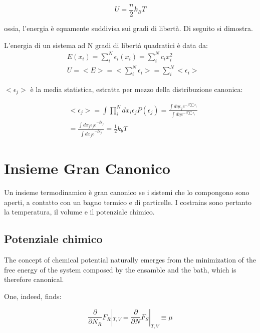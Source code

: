 \documentclass{article}
\begin{document}
\begin{equation}
    U=\frac{n}{2}k_BT
\end{equation}

ossia, l'energia è equamente suddivisa sui gradi di libertà.
Di seguito si dimostra.

L'energia di un sistema ad N gradi di libertà quadratici è data da:
\begin{equation}
    \begin{aligned}
         & E({x_i})=\sum_{i}^{N}\epsilon_i(x_i)=\sum_{i}^{N}c_ix_i^2 \\
         & U=<E>=<\sum_{i}^{N}\epsilon_i>=\sum_{i}^{N}<\epsilon_i>
    \end{aligned}
\end{equation}

$<\epsilon_j>$ è la media statistica, estratta per mezzo della distribuzione canonica:

\begin{equation}
    \begin{aligned}
         & <\epsilon_j>=\int \prod_{i}^{N}dx_i\epsilon_jP(\epsilon_j)= \frac{\int d\eta \epsilon_je^{-\beta \sum \epsilon_i}}{\int d\eta e^{-\beta \sum \epsilon_i}} \\
         & = \frac{\int dx_j\epsilon_je^{-\beta \epsilon_j}}{\int dx_je^{-\beta \epsilon_j}}=\frac{1}{2}k_bT
    \end{aligned}
\end{equation}


\section{Insieme Gran Canonico}
Un insieme termodinamico è gran canonico se i sistemi che lo compongono sono aperti, a contatto con
un bagno termico e di particelle.
I costrains sono pertanto la temperatura, il volume e il potenziale chimico.

\subsection{Potenziale chimico}

The concept of chemical potential naturally emerges from the minimization of the free energy
of the system composed by the ensamble and the bath, which is therefore canonical.

One, indeed, finds:

\begin{equation}
    \frac{\partial}{\partial N_R}F_R|_{T,V}=\frac{\partial}{\partial N}F_S|_{T,V}\equiv \mu
\end{equation}
\end{document}
